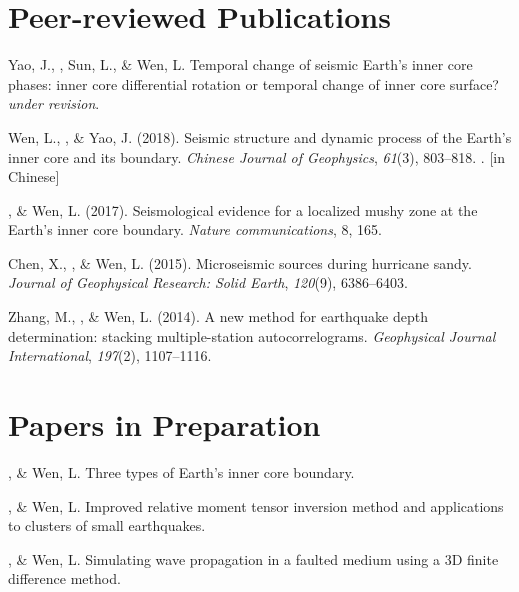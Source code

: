 \section*{Peer-reviewed Publications}
\begin{etaremune}
\item
    Yao, J., \Tian, Sun, L., \& Wen, L.
    Temporal change of seismic Earth's inner core phases: inner core differential rotation or temporal change of inner core surface?
    \textit{under revision}.
\item
    Wen, L., \Tian, \& Yao, J. (2018).
    Seismic structure and dynamic process of the Earth's inner core and its boundary.
    \textit{Chinese Journal of Geophysics}, \textit{61}(3), 803--818.
    . [in Chinese]
\item
    \Tian, \& Wen, L. (2017).
    Seismological evidence for a localized mushy zone at the Earth's inner core boundary.
    \textit{Nature communications}, 8, 165.
\item
    Chen, X., \Tian, \& Wen, L. (2015).
    Microseismic sources during hurricane sandy.
    \textit{Journal of Geophysical Research: Solid Earth}, \textit{120}(9), 6386--6403.
\item Zhang, M., \Tian, \& Wen, L. (2014).
    A new method for earthquake depth determination: stacking multiple-station autocorrelograms.
    \textit{Geophysical Journal International}, \textit{197}(2), 1107--1116.\\
\end{etaremune}

\section*{Papers in Preparation}
\begin{etaremune}
\item
    \Tian, \& Wen, L.
    Three types of Earth's inner core boundary.
\item
    \Tian, \& Wen, L.
    Improved relative moment tensor inversion method and applications to clusters of small earthquakes.
\item
    \Tian, \& Wen, L.
    Simulating wave propagation in a faulted medium using a 3D finite difference method.
\end{etaremune}
